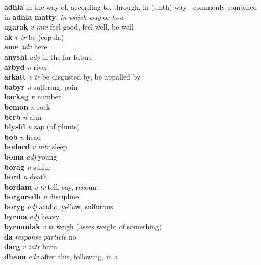 \textbf{adhla}    \textperiodcentered in the way of, according to, through, in (smth) way | commonly combined in \textbf{adhla matty}, \emph{in which way} or \emph{how}\\\textbf{agarak}   \emph{v intr} \textperiodcentered feel good, feel well, be well\\\textbf{ak}   \emph{v tr} \textperiodcentered be (copula)\\\textbf{ame}   \emph{adv} \textperiodcentered here\\\textbf{anyshl}   \emph{adv} \textperiodcentered in the far future\\\textbf{arbyd}   \emph{n} \textperiodcentered river\\\textbf{arkatt}   \emph{v tr} \textperiodcentered be disgusted by, be appalled by\\\textbf{babyr}   \emph{n} \textperiodcentered suffering, pain\\\textbf{barkag}   \emph{n} \textperiodcentered number\\\textbf{bemon}   \emph{n} \textperiodcentered rock\\\textbf{berb}   \emph{n} \textperiodcentered arm\\\textbf{blyshl}   \emph{n} \textperiodcentered sap (of plunts)\\\textbf{bob}   \emph{n} \textperiodcentered head\\\textbf{bodard}   \emph{v intr} \textperiodcentered sleep\\\textbf{boma}   \emph{adj} \textperiodcentered young\\\textbf{borag}   \emph{n} \textperiodcentered sulfur\\\textbf{bord}   \emph{n} \textperiodcentered death\\\textbf{bordam}   \emph{v tr} \textperiodcentered tell, say, recount\\\textbf{borgoredh}   \emph{n} \textperiodcentered discipline\\\textbf{boryg}   \emph{adj} \textperiodcentered acidic, yellow, sulfurous\\\textbf{byrma}   \emph{adj} \textperiodcentered heavy\\\textbf{byrmodak}   \emph{v tr} \textperiodcentered weigh (asses weight of something)\\\textbf{da}   \emph{response particle} \textperiodcentered no\\\textbf{darg}   \emph{v intr} \textperiodcentered burn\\\textbf{dhana}   \emph{adv} \textperiodcentered after this, following, in a 